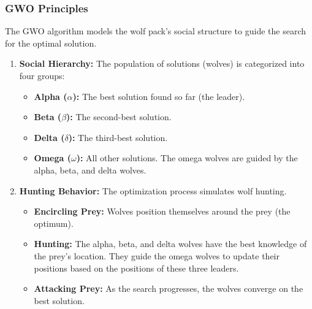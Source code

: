 \documentclass{article}
\begin{document}
\subsubsection{GWO Principles}
The GWO algorithm models the wolf pack's social structure to guide the search for the optimal solution.
\begin{enumerate}
    \item \textbf{Social Hierarchy:} The population of solutions (wolves) is categorized into four groups:
    \begin{itemize}
        \item \textbf{Alpha ($\alpha$):} The best solution found so far (the leader).
        \item \textbf{Beta ($\beta$):} The second-best solution.
        \item \textbf{Delta ($\delta$):} The third-best solution.
        \item \textbf{Omega ($\omega$):} All other solutions. The omega wolves are guided by the alpha, beta, and delta wolves.
    \end{itemize}
    \item \textbf{Hunting Behavior:} The optimization process simulates wolf hunting.
    \begin{itemize}
        \item \textbf{Encircling Prey:} Wolves position themselves around the prey (the optimum).
        \item \textbf{Hunting:} The alpha, beta, and delta wolves have the best knowledge of the prey's location. They guide the omega wolves to update their positions based on the positions of these three leaders.
        \item \textbf{Attacking Prey:} As the search progresses, the wolves converge on the best solution.
    \end{itemize}
\end{enumerate}
\end{document}
